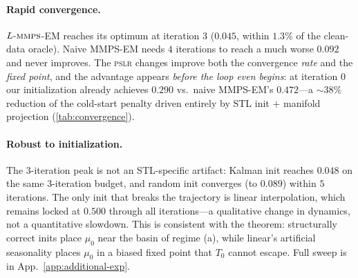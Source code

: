 \documentclass{article}
\theoremstyle{plain}
\theoremstyle{definition}
\theoremstyle{remark}
\newcommand{\pslr}{\textsc{pslr}}
\newcommand{\lmmps}{L\mbox{-}\textsc{mmps}}
\begin{document}
\begin{table}[t]
\centering
\caption{Discriminative score ($\downarrow$) per EM iteration on Energy $50\%$. Three regimes of Theorem~\ref{thm:operator-mismatch}.}
\label{tab:convergence}
\vspace{-3mm}
\end{table}

\paragraph{Rapid convergence.}
$\lmmps$-EM reaches its optimum at iteration $3$ ($0.045$, within $1.3\%$ of the clean-data oracle). Naive MMPS-EM needs $4$ iterations to reach a much worse $0.092$ and never improves. The \pslr{} changes improve both the convergence \emph{rate} and the \emph{fixed point}, and the advantage appears \emph{before the loop even begins}: at iteration $0$ our initialization already achieves $0.290$ vs.\ naive MMPS-EM's $0.472$---a ${\sim}38\%$ reduction of the cold-start penalty driven entirely by STL init $+$ manifold projection (\cref{tab:convergence}).

\paragraph{Robust to initialization.}
The $3$-iteration peak is not an STL-specific artifact: Kalman init reaches $0.048$ on the same $3$-iteration budget, and random init converges (to $0.089$) within $5$ iterations. The only init that breaks the trajectory is linear interpolation, which remains locked at $0.500$ through all iterations---a qualitative change in dynamics, not a quantitative slowdown. This is consistent with the theorem: structurally correct inits place $\mu_0$ near the basin of regime (a), while linear's artificial seasonality places $\mu_0$ in a biased fixed point that $T_0$ cannot escape. Full sweep is in App.~\ref{app:additional-exp}.
\end{document}
